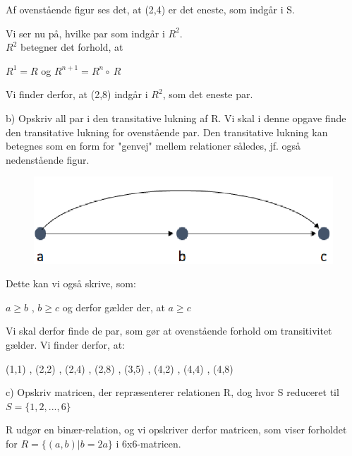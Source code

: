 \documentclass{article}
\begin{document}
Af ovenstående figur ses det, at (2,4) er det eneste, som indgår i S. 

Vi ser nu på, hvilke par som indgår i $R^2$.\\
$R^2$ betegner det forhold, at 

\begin{center}
    
    $R^1 = R$ og $R^{n+1} = R^n \circ\ R$
    
\end{center}

Vi finder derfor, at (2,8) indgår i $R^2$, som det eneste par.


b) Opskriv all par i den transitative lukning af R.
Vi skal i denne opgave finde den transitative lukning for ovenstående par. Den transitative lukning kan betegnes som en form for "genvej" mellem relationer således, jf. også nedenstående figur.


\begin{figure}[!h]
\begin{center}
\includegraphics[scale=0.5]{ABC}
\end{center}
\end{figure}

Dette kan vi også skrive, som:

\begin{center}
    $a \geq b$ , $ b \geq c $ og derfor gælder der, at $ a \geq c$
\end{center}

Vi skal derfor finde de par, som gør at ovenstående forhold om transitivitet gælder. Vi finder derfor, at:

\begin{center}
     (1,1) , (2,2) , (2,4) , (2,8) , (3,5) , (4,2) , (4,4)  , (4,8)
\end{center} 

c) Opskriv matricen, der repræsenterer relationen R, dog hvor S reduceret til $S = \{1,2,...,6\}$

R udgør en binær-relation, og vi opskriver derfor matricen, som viser forholdet for $R = \{ (a,b)  |  b = 2a\}$ i 6x6-matricen.
\end{document}
